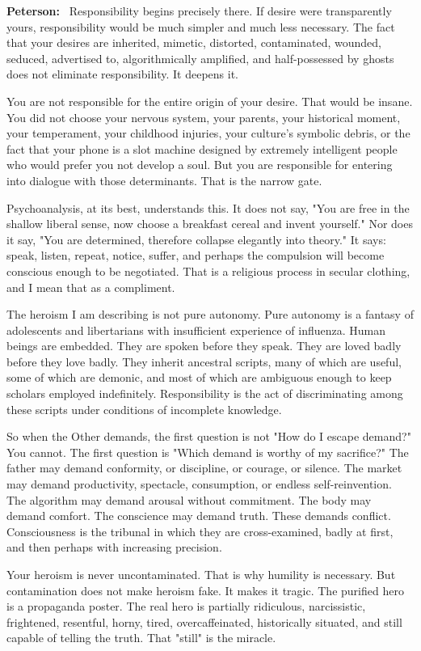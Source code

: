 \documentclass[a4paper,11pt]{article}
\newenvironment{answer}{\par\noindent\color{black}\textbf{Peterson:}\ }{\par}
\begin{document}
\begin{answer}
Responsibility begins precisely there. If desire were transparently yours, responsibility would be much simpler and much less necessary. The fact that your desires are inherited, mimetic, distorted, contaminated, wounded, seduced, advertised to, algorithmically amplified, and half-possessed by ghosts does not eliminate responsibility. It deepens it.

You are not responsible for the entire origin of your desire. That would be insane. You did not choose your nervous system, your parents, your historical moment, your temperament, your childhood injuries, your culture's symbolic debris, or the fact that your phone is a slot machine designed by extremely intelligent people who would prefer you not develop a soul. But you are responsible for entering into dialogue with those determinants. That is the narrow gate.

Psychoanalysis, at its best, understands this. It does not say, "You are free in the shallow liberal sense, now choose a breakfast cereal and invent yourself." Nor does it say, "You are determined, therefore collapse elegantly into theory." It says: speak, listen, repeat, notice, suffer, and perhaps the compulsion will become conscious enough to be negotiated. That is a religious process in secular clothing, and I mean that as a compliment.

The heroism I am describing is not pure autonomy. Pure autonomy is a fantasy of adolescents and libertarians with insufficient experience of influenza. Human beings are embedded. They are spoken before they speak. They are loved badly before they love badly. They inherit ancestral scripts, many of which are useful, some of which are demonic, and most of which are ambiguous enough to keep scholars employed indefinitely. Responsibility is the act of discriminating among these scripts under conditions of incomplete knowledge.

So when the Other demands, the first question is not "How do I escape demand?" You cannot. The first question is "Which demand is worthy of my sacrifice?" The father may demand conformity, or discipline, or courage, or silence. The market may demand productivity, spectacle, consumption, or endless self-reinvention. The algorithm may demand arousal without commitment. The body may demand comfort. The conscience may demand truth. These demands conflict. Consciousness is the tribunal in which they are cross-examined, badly at first, and then perhaps with increasing precision.

Your heroism is never uncontaminated. That is why humility is necessary. But contamination does not make heroism fake. It makes it tragic. The purified hero is a propaganda poster. The real hero is partially ridiculous, narcissistic, frightened, resentful, horny, tired, overcaffeinated, historically situated, and still capable of telling the truth. That "still" is the miracle.
\end{answer}
\end{document}
